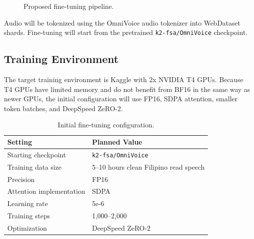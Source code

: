 \documentclass[11pt]{article}
\begin{document}
\begin{figure}[htbp]
  \centering
  \small
  \caption{Proposed fine-tuning pipeline.}
  \label{fig:fine-tuning-pipeline}
\end{figure}

Audio will be tokenized using the OmniVoice audio tokenizer into WebDataset shards. Fine-tuning will start from the pretrained \texttt{k2-fsa/OmniVoice} checkpoint.

\subsection{Training Environment}

The target training environment is Kaggle with 2x NVIDIA T4 GPUs. Because T4 GPUs have limited memory and do not benefit from BF16 in the same way as newer GPUs, the initial configuration will use FP16, SDPA attention, smaller token batches, and DeepSpeed ZeRO-2.

\begin{table}[htbp]
  \centering
  \caption{Initial fine-tuning configuration.}
  \begin{tabular}{ll}
    \toprule
    Setting & Planned Value \\
    \midrule
    Starting checkpoint & \texttt{k2-fsa/OmniVoice} \\
    Training data size & 5--10 hours clean Filipino read speech \\
    Precision & FP16 \\
    Attention implementation & SDPA \\
    Learning rate & 5e-6 \\
    Training steps & 1,000--2,000 \\
    Optimization & DeepSpeed ZeRO-2 \\
    \bottomrule
  \end{tabular}
\end{table}
\end{document}
